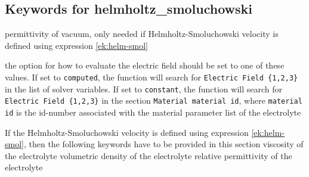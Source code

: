 \subsection{Keywords for helmholtz\_smoluchowski}

\sifbegin

  \sifbegin
   permittivity of vacuum, only needed if Helmholtz-Smoluchowski velocity is defined using expression \eqref{ek:helm-smol}
  \sifend

  \sifbegin
    the option for how to evaluate the electric field should be set to one of these values.\newline
    If set to  \texttt{computed}, the function will search for \texttt{Electric Field \{1,2,3\}} in the list of solver variables. If set to \texttt{constant}, the function will search for \texttt{Electric Field \{1,2,3\}} in the section \texttt{Material material id}, where \texttt{material id} is the id-number associated with the material parameter list of the electrolyte
  \sifend

   \newline
  If the Helmholtz-Smoluchowski velocity is defined using expression \eqref{ek:helm-smol}, then the following keywords have to be provided in this section
  \sifbegin
   viscosity of the electrolyte
  volumetric density of the electrolyte
   relative permittivity of the electrolyte
  \sifend

